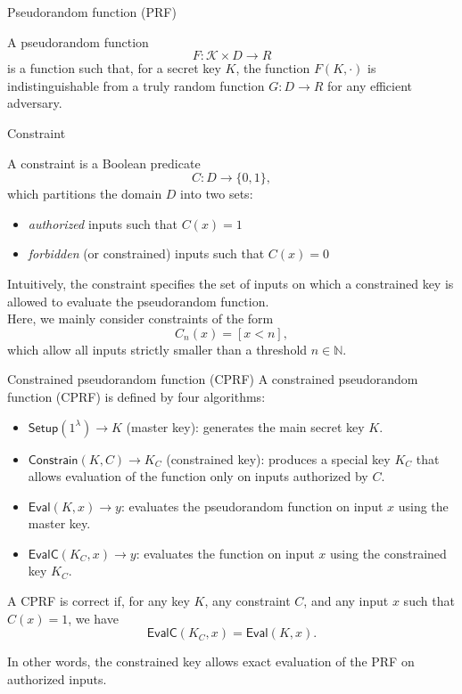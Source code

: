 \documentclass[9pt]{extarticle}
\begin{document}
\begin{defbox}{Pseudorandom function (PRF)}

A pseudorandom function
\[
F : \mathcal K \times D \rightarrow R
\]
is a function such that, for a secret key $K$, the function $F(K,\cdot)$ is
indistinguishable from a truly random function
$G : D \rightarrow R$ for any efficient adversary.
\end{defbox}

\begin{defbox}{Constraint}

A constraint is a Boolean predicate
\[
C : D \rightarrow \{0,1\},
\]
which partitions the domain $D$ into two sets:
\begin{itemize}
\item \emph{authorized} inputs such that $C(x)=1$
\item \emph{forbidden} (or constrained) inputs such that $C(x)=0$
\end{itemize}

Intuitively, the constraint specifies the set of inputs on which a constrained key
is allowed to evaluate the pseudorandom function.\\

Here, we mainly consider constraints of the form
\[
C_n(x) = [x < n],
\]
which allow all inputs strictly smaller than a threshold $n \in \mathbb{N}$.
\end{defbox}

\begin{defbox}{Constrained pseudorandom function (CPRF)}
A constrained pseudorandom function (CPRF) is defined by four algorithms:
\begin{itemize}
\item $\textsf{Setup}(1^\lambda) \to K$ (master key): generates the main secret key $K$.
\item $\textsf{Constrain}(K,C) \to K_C$ (constrained key): produces a special key $K_C$
that allows evaluation of the function only on inputs authorized by $C$.
\item $\textsf{Eval}(K,x) \to y$: evaluates the pseudorandom function on input $x$ using the master key.
\item $\textsf{EvalC}(K_C,x) \to y$: evaluates the function on input $x$ using the constrained key $K_C$.
\end{itemize}

A CPRF is correct if, for any key $K$, any constraint $C$, and any input $x$
such that $C(x)=1$, we have
\[
\textsf{EvalC}(K_C,x)=\textsf{Eval}(K,x).
\]

In other words, the constrained key allows exact evaluation of the PRF on authorized inputs.
\end{defbox}
\end{document}
